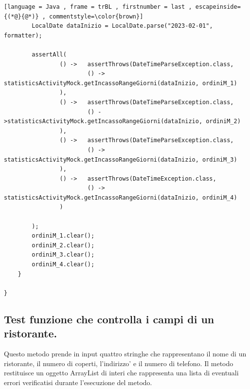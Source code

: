 \begin{lstlisting}[language = Java , frame = trBL , firstnumber = last , escapeinside={(*@}{@*)} , commentstyle=\color{brown}]
        LocalDate dataInizio = LocalDate.parse("2023-02-01", formatter);

        assertAll(
                () ->   assertThrows(DateTimeParseException.class,
                        () -> statisticsActivityMock.getIncassoRangeGiorni(dataInizio, ordiniM_1)
                ),
                () ->   assertThrows(DateTimeParseException.class,
                        () ->statisticsActivityMock.getIncassoRangeGiorni(dataInizio, ordiniM_2)
                ),
                () ->   assertThrows(DateTimeParseException.class,
                        () -> statisticsActivityMock.getIncassoRangeGiorni(dataInizio, ordiniM_3)
                ),
                () ->   assertThrows(DateTimeException.class,
                        () -> statisticsActivityMock.getIncassoRangeGiorni(dataInizio, ordiniM_4)
                )

        );
        ordiniM_1.clear();
        ordiniM_2.clear();
        ordiniM_3.clear();
        ordiniM_4.clear();
    }

}

\end{lstlisting}



\subsection{Test funzione che controlla i campi di un ristorante.}
\begin{flushleft}
    Questo metodo prende in input quattro stringhe che rappresentano il nome di un ristorante,
     il numero di coperti, l'indirizzo' e il numero di telefono. Il metodo restituisce un oggetto ArrayList
     di interi che rappresenta una lista di eventuali errori verificatisi durante l'esecuzione del metodo.
\end{flushleft}
\vspace{0.2cm}

